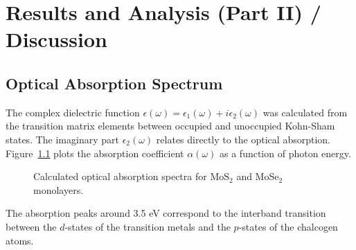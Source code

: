 \chapter{Results and Analysis (Part II) / Discussion}
\label{ch:results_2}

\section{Optical Absorption Spectrum}
The complex dielectric function $\epsilon(\omega) = \epsilon_1(\omega) + i\epsilon_2(\omega)$ was calculated from the transition matrix elements between occupied and unoccupied Kohn-Sham states. The imaginary part $\epsilon_2(\omega)$ relates directly to the optical absorption. Figure~\ref{fig:absorption} plots the absorption coefficient $\alpha(\omega)$ as a function of photon energy.

\begin{figure}[htbp]
    \centering
    \caption{Calculated optical absorption spectra for MoS$_2$ and MoSe$_2$ monolayers.}
    \label{fig:absorption}
\end{figure}

The absorption peaks around 3.5 eV correspond to the interband transition between the $d$-states of the transition metals and the $p$-states of the chalcogen atoms.

